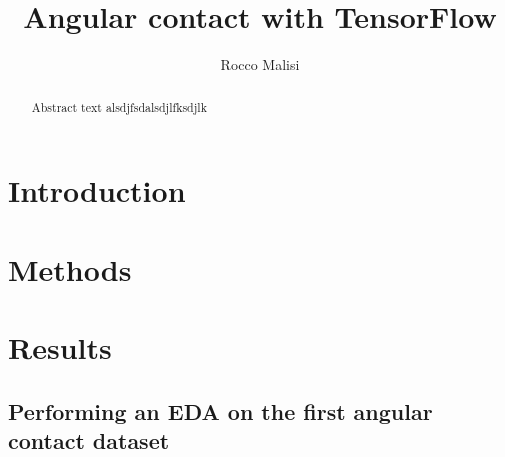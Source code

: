 \documentclass[letterpaper,10pt]{article}
\title{Angular contact with TensorFlow}
\author{Rocco Malisi}
\begin{document}
	\maketitle
	\newpage
	
	\begin{abstract}
		Abstract text alsdjfsdalsdjlfksdjlk
	\end{abstract}
	\newpage
	
	\tableofcontents
	\newpage
	
	\section{Introduction}
	\section{Methods}
	\section{Results}
	\subsection{Performing an EDA on the first angular contact dataset}
	
	\newpage
	 
	
	
\end{document}
